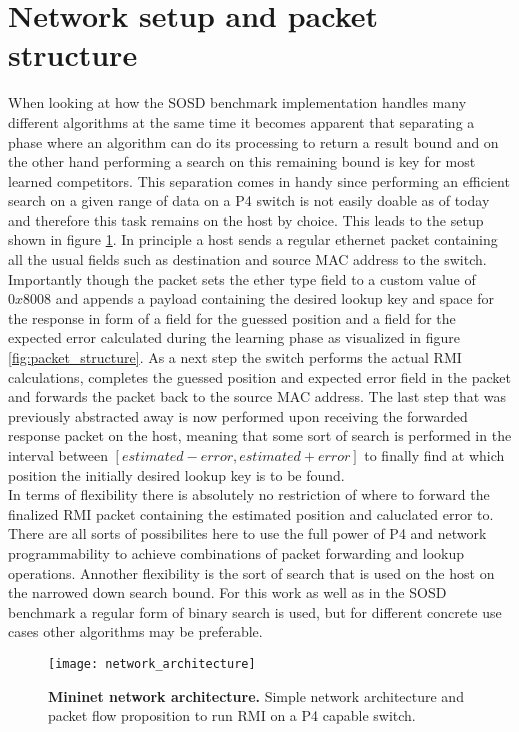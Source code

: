 \section{Network setup and packet structure}
When looking at how the SOSD benchmark implementation handles many different algorithms at the same time it becomes apparent that separating a phase where an algorithm can do its processing to return a result bound and on the other hand performing a search on this remaining bound is key for most learned competitors. This separation comes in handy since performing an efficient search on a given range of data on a P4 switch is not easily doable as of today and therefore this task remains on the host by choice. This leads to the setup shown in figure \ref{fig:network_architecture}. In principle a host sends a regular ethernet packet containing all the usual fields such as destination and source MAC address to the switch. Importantly though the packet sets the ether type field to a custom value of $0x8008$ and appends a payload containing the desired lookup key and space for the response in form of a field for the guessed position and a field for the expected error calculated during the learning phase as visualized in figure  \ref{fig:packet_structure}. As a next step the switch performs the actual RMI calculations, completes the guessed position and expected error field in the packet and forwards the packet back to the source MAC address. The last step that was previously abstracted away is now performed upon receiving the forwarded response packet on the host, meaning that some sort of search is performed in the interval between \([estimated - error, estimated + error]\) to finally find at which position the initially desired lookup key is to be found.\\

In terms of flexibility there is absolutely no restriction of where to forward the finalized RMI packet containing the estimated position and caluclated error to. There are all sorts of possibilites here to use the full power of P4 and network programmability to achieve combinations of packet forwarding and lookup operations. Annother flexibility is the sort of search that is used on the host on the narrowed down search bound. For this work as well as in the SOSD benchmark a regular form of binary search is used, but for different concrete use cases other algorithms may be preferable.

\begin{figure}[ht]
  \centering
  \texttt{[image: network\_architecture]}
  \caption[Network architecture]{
    \textbf{Mininet network architecture.} Simple network architecture and packet flow proposition to run RMI on a P4 capable switch.
  }
  \label{fig:network_architecture}
\end{figure}


